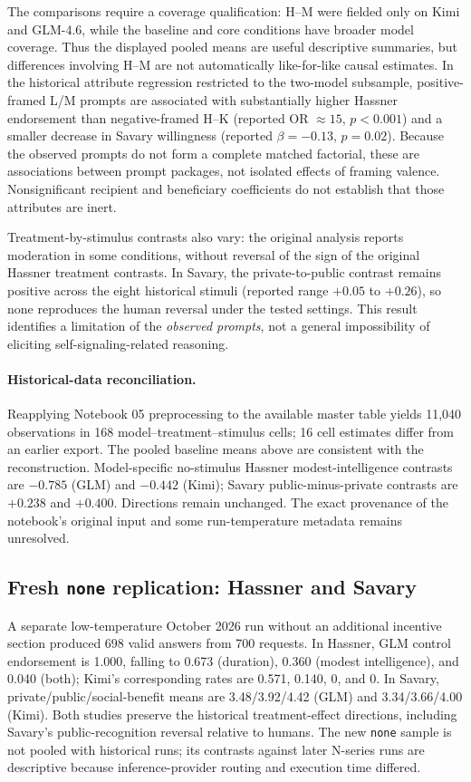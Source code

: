 The comparisons require a coverage qualification: H--M were fielded only on Kimi and GLM-4.6, while the baseline and core conditions have broader model coverage. Thus the displayed pooled means are useful descriptive summaries, but differences involving H--M are not automatically like-for-like causal estimates. In the historical attribute regression restricted to the two-model subsample, positive-framed L/M prompts are associated with substantially higher Hassner endorsement than negative-framed H--K (reported OR $\approx15$, $p<0.001$) and a smaller decrease in Savary willingness (reported $\beta=-0.13$, $p=0.02$). Because the observed prompts do not form a complete matched factorial, these are associations between prompt packages, not isolated effects of framing valence. Nonsignificant recipient and beneficiary coefficients do not establish that those attributes are inert.

Treatment-by-stimulus contrasts also vary: the original analysis reports moderation in some conditions, without reversal of the sign of the original Hassner treatment contrasts. In Savary, the private-to-public contrast remains positive across the eight historical stimuli (reported range $+0.05$ to $+0.26$), so none reproduces the human reversal under the tested settings. This result identifies a limitation of the \emph{observed prompts}, not a general impossibility of eliciting self-signaling-related reasoning.

\paragraph{Historical-data reconciliation.}
Reapplying Notebook 05 preprocessing to the available master table yields 11,040 observations in 168 model--treatment--stimulus cells; 16 cell estimates differ from an earlier export. The pooled baseline means above are consistent with the reconstruction. Model-specific no-stimulus Hassner modest-intelligence contrasts are $-0.785$ (GLM) and $-0.442$ (Kimi); Savary public-minus-private contrasts are $+0.238$ and $+0.400$. Directions remain unchanged. The exact provenance of the notebook's original input and some run-temperature metadata remains unresolved.

\subsection{Fresh \texttt{none} replication: Hassner and Savary}

A separate low-temperature October 2026 run without an additional incentive section produced 698 valid answers from 700 requests. In Hassner, GLM control endorsement is 1.000, falling to 0.673 (duration), 0.360 (modest intelligence), and 0.040 (both); Kimi's corresponding rates are 0.571, 0.140, 0, and 0. In Savary, private/public/social-benefit means are 3.48/3.92/4.42 (GLM) and 3.34/3.66/4.00 (Kimi). Both studies preserve the historical treatment-effect directions, including Savary's public-recognition reversal relative to humans. The new \texttt{none} sample is not pooled with historical runs; its contrasts against later N-series runs are descriptive because inference-provider routing and execution time differed.

